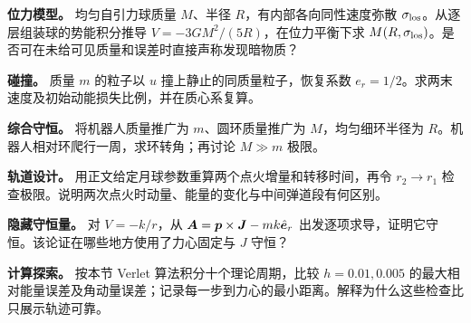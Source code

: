 \begin{bookexercises}
\item {} \textbf{位力模型。} 均匀自引力球质量 $M$、半径 $R$，有内部各向同性速度弥散 $\sigma_{\rm los}$。从逐层组装球的势能积分推导 $V=-3GM^2/(5R)$，在位力平衡下求 $M(R,\sigma_{\rm los})$。是否可在未给可见质量和误差时直接声称发现暗物质？
\item {} \textbf{碰撞。} 质量 $m$ 的粒子以 $u$ 撞上静止的同质量粒子，恢复系数 $e_r=1/2$。求两末速度及初始动能损失比例，并在质心系复算。
\item {} \textbf{综合守恒。} 将机器人质量推广为 $m$、圆环质量推广为 $M$，均匀细环半径为 $R$。机器人相对环爬行一周，求环转角；再讨论 $M\gg m$ 极限。
\item {} \textbf{轨道设计。} 用正文给定月球参数重算两个点火增量和转移时间，再令 $r_2\to r_1$ 检查极限。说明两次点火时动量、能量的变化与中间弹道段有何区别。
\item {} \textbf{隐藏守恒量。} 对 $V=-k/r$，从 $\boldsymbol{A}=\boldsymbol{p}\times\boldsymbol{J}-mk\hat{\boldsymbol{e}}_r$ 出发逐项求导，证明它守恒。该论证在哪些地方使用了力心固定与 $J$ 守恒？
\item {} \textbf{计算探索。} 按本节 Verlet 算法积分十个理论周期，比较 $h=0.01,0.005$ 的最大相对能量误差及角动量误差；记录每一步到力心的最小距离。解释为什么这些检查比只展示轨迹可靠。
\end{bookexercises}

